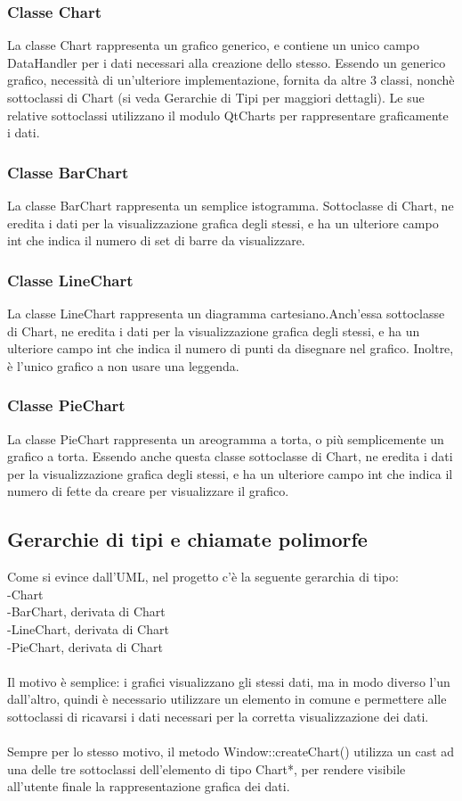 \documentclass[10pt]{article}
\begin{document}
    \subsubsection{Classe Chart}
    La classe Chart rappresenta un grafico generico, e contiene un unico campo DataHandler per i dati necessari alla creazione dello stesso. Essendo un generico grafico, necessità di un'ulteriore implementazione, fornita da altre 3 classi, nonchè sottoclassi di Chart (si veda Gerarchie di Tipi per maggiori dettagli).
    Le sue relative sottoclassi utilizzano il modulo QtCharts per rappresentare graficamente i dati.
    \subsubsection{Classe BarChart}
    La classe BarChart rappresenta un semplice istogramma. Sottoclasse di Chart, ne eredita i dati per la visualizzazione grafica degli stessi, e ha un ulteriore campo int che indica il numero di set di barre da visualizzare.
    \subsubsection{Classe LineChart}
    La classe LineChart rappresenta un diagramma cartesiano.Anch'essa sottoclasse di Chart, ne eredita i dati per la visualizzazione grafica degli stessi, e ha un ulteriore campo int che indica il numero di punti da disegnare nel grafico. Inoltre, è l'unico grafico a non usare una leggenda.
    \subsubsection{Classe PieChart}
    La classe PieChart rappresenta un areogramma a torta, o più semplicemente un grafico a torta. Essendo anche questa classe sottoclasse di Chart, ne eredita i dati per la visualizzazione grafica degli stessi, e ha un ulteriore campo int che indica il numero di fette da creare per visualizzare il grafico.
    \subsection{Gerarchie di tipi e chiamate polimorfe}
    Come si evince dall'UML, nel progetto c'è la seguente gerarchia di tipo:\\
    -Chart\\
    -BarChart, derivata di Chart\\
    -LineChart, derivata di Chart\\
    -PieChart, derivata di Chart\\\\
    Il motivo è semplice: i grafici visualizzano gli stessi dati, ma in modo diverso l'un dall'altro, quindi è necessario utilizzare un elemento in comune e permettere alle sottoclassi di ricavarsi i dati necessari per la corretta visualizzazione dei dati.
    \\
    \\
    Sempre per lo stesso motivo, il metodo Window::createChart() utilizza un cast ad una delle tre sottoclassi dell'elemento di tipo Chart*, per rendere visibile all'utente finale la rappresentazione grafica dei dati.
\end{document}

